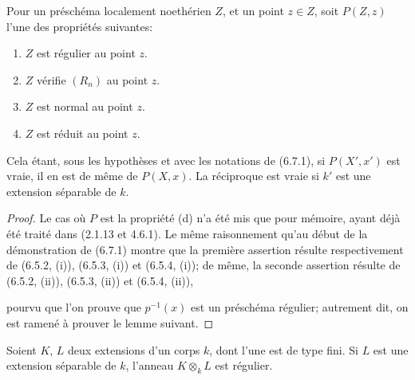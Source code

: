 \begin{proposition}[6.7.4]
\label{IV.2.s6.7.4-fr}
Pour un préschéma localement noethérien $Z$, et un point $z\in Z$,
soit $P(Z,z)$ l'une des propriétés suivantes:
\begin{enumerate}
\item[(a)] $Z$ est régulier au point $z$.
\item[(b)] $Z$ vérifie $(R_n)$ au point $z$.
\item[(c)] $Z$ est normal au point $z$.
\item[(d)] $Z$ est réduit au point $z$.
\end{enumerate}
Cela étant, sous les hypothèses et avec les notations de (6.7.1), si
$P(X',x')$ est vraie, il en est de même de $P(X,x)$. La réciproque est
vraie si $k'$ est une extension séparable de $k$.
\end{proposition}

\begin{proof}
Le cas où $P$ est la propriété (d) n'a été mis que pour mémoire, ayant
déjà été traité dans (2.1.13 et 4.6.1). Le même raisonnement qu'au début
de la démonstration de (6.7.1) montre que la première assertion résulte
respectivement de (6.5.2, (i)), (6.5.3, (i)) et (6.5.4, (i)); de même,
la seconde assertion résulte de (6.5.2, (ii)), (6.5.3, (ii)) et
(6.5.4, (ii)),


pourvu que l'on prouve que $p^{-1}(x)$ est un préschéma régulier; autrement
dit, on est ramené à prouver le lemme suivant.
\end{proof}

\begin{lemma}[6.7.4.1]
\label{IV.2.s6.7.4.1-fr}
Soient $K$, $L$ deux extensions d'un corps $k$, dont l'une est de type
fini. Si $L$ est une extension séparable de $k$, l'anneau $K\otimes_kL$
est régulier.
\end{lemma}

